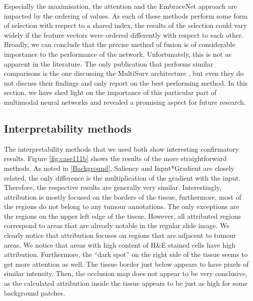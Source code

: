 Especially the maximisation, the attention and the EmbraceNet approach are impacted by the ordering of values. As each of these methods perform some form of selection with respect to a shared index, the results of the selection could vary widely if the feature vectors were ordered differently with respect to each other.
Broadly, we can conclude that the precise method of fusion is of considerable importance to the performance of the network. Unfortunately, this is not as apparent in the literature. The only publication that performs similar comparisons is the one discussing the MultiSurv architecture \cite{ValeSilva2021Long}, but even they do not discuss their findings and only report on the best performing method. 
In this section, we have shed light on the importance of this particular part of multimodal neural networks and revealed a promising aspect for future research.

\subsection{Interpretability methods}


The interpretability methods that we used both show interesting confirmatory results. Figure \ref{fig:case111b} shows the results of the more straightforward methods. As noted in \ref{Background}, Saliency and Input*Gradient are closely related, the only difference is the multiplication of the gradient with the input. Therefore, the respective results are generally very similar.
Interestingly, attribution is mostly focused on the borders of the tissue, furthermore, most of the regions do not belong to any tumour annotations. The only exceptions are the regions on the upper left edge of the tissue. However, all attributed regions correspond to areas that are already notable in the regular slide image. We clearly notice that attribution focuses on regions that are adjacent to tumour areas. We notice that areas with high content of H\&E stained cells have high attribution. Furthermore, the “dark spot” on the right side of the tissue seems to get more attention as well. The tissue border just below appears to have pixels of similar intensity. Then, the occlusion map does not appear to be very conclusive, as the calculated attribution inside the tissue appears to be just as high for some background patches. 

